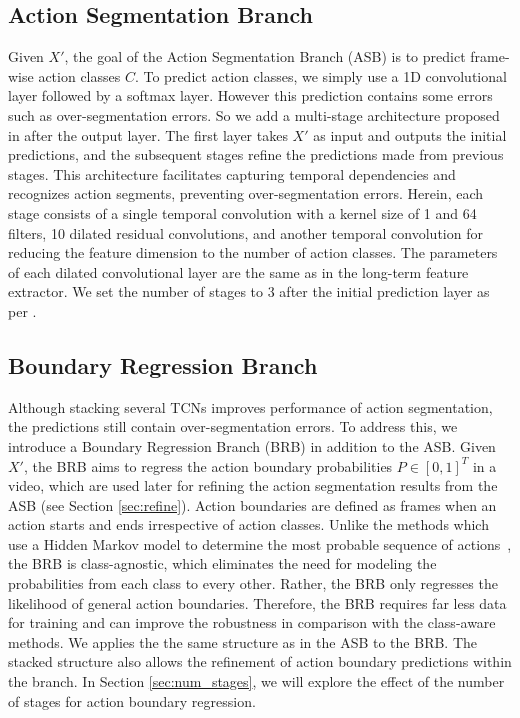 \documentclass[10pt,twocolumn,letterpaper]{article}
\begin{document}
\subsection{Action Segmentation Branch}
\label{asb}
Given $X'$, the goal of the Action Segmentation Branch (ASB) is to predict frame-wise action classes $C$.
To predict action classes, we simply use a 1D convolutional layer followed by a softmax layer.
However this prediction contains some errors such as over-segmentation errors.
So we add a multi-stage architecture proposed in \cite{mstcn} after the output layer.
The first layer takes $X'$ as input and outputs the initial predictions,
and the subsequent stages refine the predictions made from previous stages.
This architecture facilitates capturing temporal dependencies and recognizes action segments, 
preventing over-segmentation errors.
Herein, each stage consists of a single temporal convolution with a kernel size of 1 and 64 filters,
10 dilated residual convolutions, and another temporal convolution
for reducing the feature dimension to the number of action classes. 
The parameters of each dilated convolutional layer are the same as in the long-term feature extractor.
We set the number of stages to 3 after the initial prediction layer as per \cite{mstcn}.

\subsection{Boundary Regression Branch}
\label{brb}
Although stacking several TCNs improves performance of action segmentation,
the predictions still contain over-segmentation errors.
To address this, we introduce a Boundary Regression Branch (BRB) in addition to the ASB.
Given $X'$, the BRB aims to regress the action boundary probabilities $P \in [0, 1]^T$ in a video,
which are used later for refining the action segmentation results from the ASB (see Section \ref{sec:refine}).
Action boundaries are defined as frames when an action starts and ends irrespective of action classes.
Unlike the methods which use a Hidden Markov model to determine the most probable sequence of actions~\cite{markov1,hmm},
the BRB is class-agnostic, which eliminates the need for modeling the probabilities from each class to every other.
Rather, the BRB only regresses the likelihood of general action boundaries.
Therefore, the BRB requires far less data for training and can improve the robustness in comparison with the class-aware methods.
We applies the the same structure as in the ASB to the BRB.
The stacked structure also allows the refinement of action boundary predictions within the branch.
In Section \ref{sec:num_stages}, we will explore the effect of the number of stages for action boundary regression.
\end{document}

